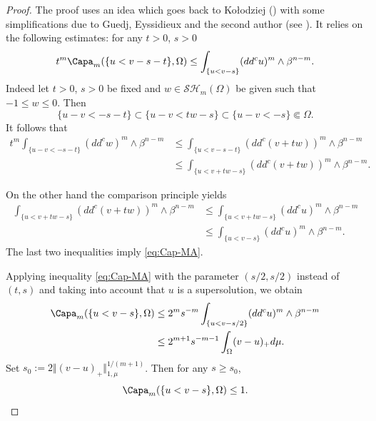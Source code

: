 \begin{proof}
The proof uses an idea which goes back to Ko\l odziej (\cite{Kol96}) with some simplifications due to Guedj, Eyssidieux and the second author (see \cite{EGZ09, GKZ08}). It relies on the following estimates: for any $t > 0$, $s > 0$
\begin{equation}\label{eq:Cap-MA}
t^m \Capa_m(\{u< v -s-t\},\Omega)\leq \int_{\{u<v -s\}}(dd^cu)^m\wedge\beta^{n-m}.
\end{equation}
Indeed let $t > 0$, $s > 0$ be fixed and $ w \in \mathcal{SH}_m(\Omega)$ be given such that $-1 \leq w \leq0$. Then
\[\{u-v<-s-t\}\subset\{u-v< t w -s\} \subset\{u-v<-s\} \Subset\Omega.\]
It follows that
\begin{align*}
t^m \int_{\{u-v<-s-t\}}(dd^c w)^m\wedge\beta^{n-m}&\leq\int_{\{u< v - s-t\}}(dd^c(v+tw))^m\wedge\beta^{n-m}\\
&\leq \int_{\{u< v+ tw - s\}}(dd^c(v+tw))^m\wedge\beta^{n-m}.
\end{align*}

On the other hand the comparison principle yields
\begin{align*}
\int_{\{u< v+ tw - s\}}(dd^c(v+tw))^m\wedge\beta^{n-m} &\leq\int_{\{u < v +t w - s\}}(dd^c u)^m\wedge\beta^{n-m}\\
&\leq\int_{\{u< v -s\}}(dd^cu)^m\wedge\beta^{n-m}.
\end{align*}
The last two inequalities imply \eqref{eq:Cap-MA}.

Applying inequality \eqref{eq:Cap-MA} with the parameter $(s \slash 2, s\slash 2)$ instead of $(t,s)$ and taking into account that $u$ is a supersolution, we obtain
\[
\begin{split}
\Capa_m(\{u< v - s \},\Omega) & \leq 2^m s^{-m} \int_{\{u<v - s\slash 2\}}(dd^cu)^m\wedge\beta^{n-m} \\
& \leq 2^{m + 1} s^{-m - 1} \int_\Omega (v-u)_+ d \mu.
\end{split}
\]
Set $s_0:= 2 \Vert (v-u)_+\Vert_{1,\mu}^{1 \slash (m+1)}$. Then for any $s \geq s_0$,
\begin{equation} \label{eq:smallcap}
\Capa_m(\{u< v - s \},\Omega)\leq 1.
\end{equation}


\end{proof}
